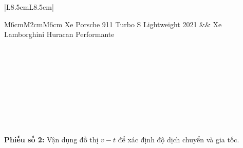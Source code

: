 \begin{center}
\begin{longtable}{|L{8.5cm}L{8.5cm}|}
{\begin{center}
\begin{tabular}{M{6cm}M{2cm}M{6cm}}
					Xe Porsche 911 Turbo S Lightweight 2021 && Xe Lamborghini Huracan Performante\\
				\end{tabular}
			\end{center}
			\dotfill
		}\\
		\\
		
		\\
		\hline
		\\
		\\
		\\
		
		\\
		\\
		\hline
	\end{longtable}
\end{center}
\textbf{Phiếu số 2:} Vận dụng đồ thị $v-t$ để xác định độ dịch chuyển và gia tốc.
